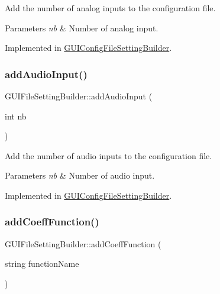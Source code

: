Add the number of analog inputs to the configuration file. 


\begin{DoxyParams}{Parameters}
{\em nb} & Number of analog input. \\
\hline
\end{DoxyParams}


Implemented in \mbox{\hyperlink{class_g_u_i_config_file_setting_builder_ae59473c0fb774b24b6a96a1b6e371dd1}{G\+U\+I\+Config\+File\+Setting\+Builder}}.

\mbox{\label{class_g_u_i_file_setting_builder_adf0f3d72bbc03dd11d4914410e6bee3b}} 
\subsubsection{\texorpdfstring{add\+Audio\+Input()}{addAudioInput()}}
{\footnotesize\ttfamily G\+U\+I\+File\+Setting\+Builder\+::add\+Audio\+Input (\begin{DoxyParamCaption}\item[{int}]{nb }\end{DoxyParamCaption})\hspace{0.3cm}{\ttfamily [pure virtual]}}



Add the number of audio inputs to the configuration file. 


\begin{DoxyParams}{Parameters}
{\em nb} & Number of audio input. \\
\hline
\end{DoxyParams}


Implemented in \mbox{\hyperlink{class_g_u_i_config_file_setting_builder_adedbf3183bfae8c718f22ea704ac3074}{G\+U\+I\+Config\+File\+Setting\+Builder}}.

\mbox{\label{class_g_u_i_file_setting_builder_a03833a30982887633f6b9d0e3d71e1f8}} 
\subsubsection{\texorpdfstring{add\+Coeff\+Function()}{addCoeffFunction()}}
{\footnotesize\ttfamily G\+U\+I\+File\+Setting\+Builder\+::add\+Coeff\+Function (\begin{DoxyParamCaption}\item[{string}]{function\+Name }\end{DoxyParamCaption})\hspace{0.3cm}{\ttfamily [pure virtual]}}



